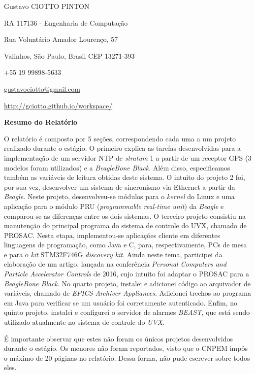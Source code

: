 \documentclass[12pt, a4paper]{article}
\begin{document}
\pagestyle{empty} 

Gustavo CIOTTO PINTON

RA 117136 - Engenharia de Computação

Rua Voluntário Amador Lourenço, 57

Valinhos, São Paulo, Brasil CEP 13271-393

+55 19 99898-5633

\url{gustavociotto@gmail.com}

\url{http://gciotto.github.io/workspace/}


\begin{center}
\textbf{Resumo do Relatório}
\end{center}

O relatório é composto por 5 seções, correspondendo cada uma a um projeto
realizado durante o estágio. O primeiro explica as tarefas desenvolvidas para a
implementação de um servidor NTP de \textit{stratum} 1 a partir de um receptor
GPS (3 modelos foram utilizados) e a \textit{BeagleBone Black}. Além disso,
especificamos também as variáveis de leitura obtidas deste sistema. O
intuito do projeto 2 foi, por sua vez, desenvolver um sistema de sincronismo via
Ethernet a partir da \textit{Beagle}. Neste projeto, desenvolveu-se módulos para
o \textit{kernel} do Linux e uma aplicação para o módulo PRU
(\textit{programmable real-time unit}) da \textit{Beagle} e comparou-se as
diferenças entre os dois sistemas. O terceiro projeto consistiu na manutenção do
principal programa do sistema de controle do UVX, chamado de PROSAC. Nesta
etapa, implementou-se aplicações cliente em diferentes linguagens de
programação, como Java e C, para, respectivamente, PCs de mesa e para o
\textit{kit} STM32F746G \textit{discovery kit}.  Ainda neste tema, participei da
elaboração de um artigo, lançada na conferência \textit{Personal Computers and
Particle Accelerator Controls} de 2016, cujo intuito foi adaptar o PROSAC para a
\textit{BeagleBone Black}. No quarto projeto, instalei e adicionei código ao
arquivador de variáveis, chamado de  \textit{EPICS Archiver Appliances}.
Adicionei trechos ao programa em Java para verificar se um usuário foi
corretamente autenticado. Enfim, no quinto projeto, instalei e configurei o
servidor de alarmes \textit{BEAST}, que está sendo utilizado atualmente no
sistema de controle do \textit{UVX}.

\vspace{12pt}

É importante observar que estes não foram os únicos projetos desenvolvidos
durante o estágio. Os menores não foram reportados, visto que o CNPEM impôs o
máximo de 20 páginas no relatório. Dessa forma, não pude escrever sobre todos
eles.
\end{document}

